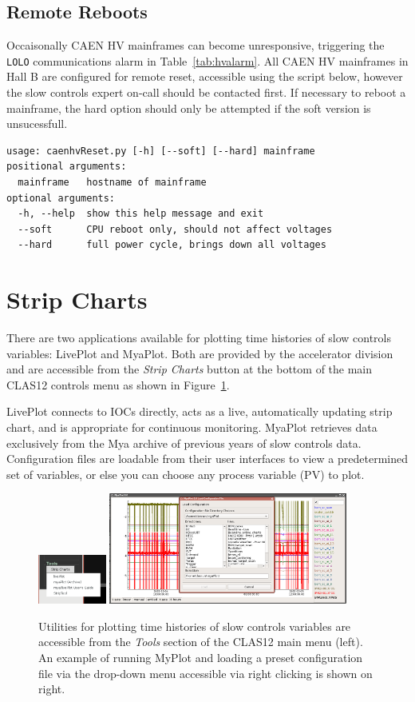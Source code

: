 \documentclass[amsmath,amssymb,notitlepage,11pt]{revtex4}
\begin{document}
\subsection{Remote Reboots}
Occaisonally CAEN HV mainframes can become unresponsive, triggering the \texttt{LOLO} communications alarm in Table~\ref{tab:hvalarm}.  All CAEN HV mainframes in Hall B are configured for remote reset, accessible using the script below, however the slow controls expert on-call should be contacted first.  If necessary to reboot a mainframe, the hard option should only be attempted if the soft version is unsucessfull.

\begin{verbatim}
usage: caenhvReset.py [-h] [--soft] [--hard] mainframe
positional arguments:
  mainframe   hostname of mainframe
optional arguments:
  -h, --help  show this help message and exit
  --soft      CPU reboot only, should not affect voltages
  --hard      full power cycle, brings down all voltages
\end{verbatim}

\clearpage

\section{Strip Charts}
There are two applications available for plotting time histories of slow controls variables:  LivePlot and MyaPlot.  Both are provided by the accelerator division and are accessible from the {\em Strip Charts} button at the bottom of the main CLAS12 controls menu as shown in Figure~\ref{fig:strips}.

LivePlot connects to IOCs directly, acts as a live, automatically updating strip chart, and is appropriate for continuous monitoring.  MyaPlot retrieves data exclusively from the Mya archive of previous years of slow controls data.  Configuration files are loadable from their user interfaces to view a predetermined set of variables, or else you can choose any process variable (PV) to plot.

\begin{figure}[htbp]\centering
    \includegraphics[width=0.2\textwidth]{pics/strips}
    \includegraphics[width=0.7\textwidth]{pics/myaplot}
    \caption{Utilities for plotting time histories of slow controls variables are accessible from the {\em Tools} section of the CLAS12 main menu (left).  An example of running MyPlot and loading a preset configuration file via the drop-down menu accessible via right clicking is shown on right.\label{fig:strips}}
\end{figure}
\end{document}
